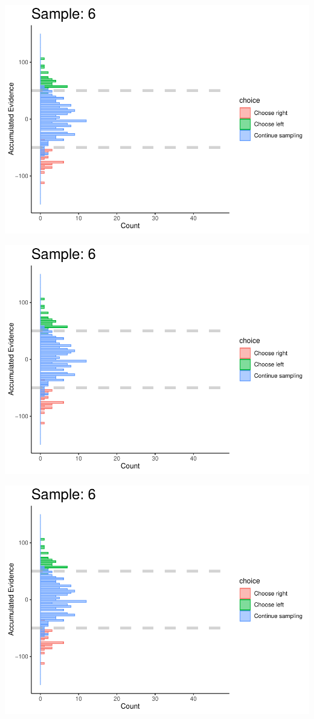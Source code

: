 \documentclass[
]{book}
\begin{document}
\begin{center}\includegraphics[width=0.8\linewidth]{LateNightBayes_files/figure-latex/fixed_check-52} \end{center}

\begin{center}\includegraphics[width=0.8\linewidth]{LateNightBayes_files/figure-latex/fixed_check-53} \end{center}

\begin{center}\includegraphics[width=0.8\linewidth]{LateNightBayes_files/figure-latex/fixed_check-54} \end{center}
\end{document}
